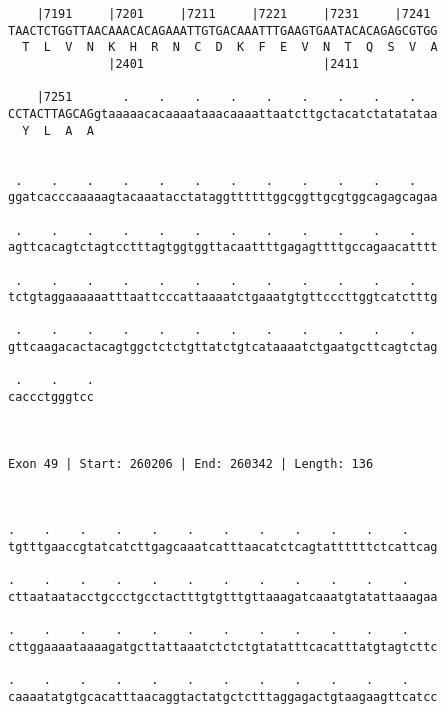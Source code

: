 \documentclass{article}
\begin{document}
\begin{Verbatim}
    |7191     |7201     |7211     |7221     |7231     |7241 
TAACTCTGGTTAACAAACACAGAAATTGTGACAAATTTGAAGTGAATACACAGAGCGTGG
  T  L  V  N  K  H  R  N  C  D  K  F  E  V  N  T  Q  S  V  A
              |2401                         |2411           
  
    |7251       .    .    .    .    .    .    .    .    .   
CCTACTTAGCAGgtaaaaacacaaaataaacaaaattaatcttgctacatctatatataa
  Y  L  A  A                                                
                                                            
  
 .    .    .    .    .    .    .    .    .    .    .    .   
ggatcacccaaaaagtacaaatacctataggttttttggcggttgcgtggcagagcagaa
                                                            
 .    .    .    .    .    .    .    .    .    .    .    .   
agttcacagtctagtcctttagtggtggttacaattttgagagttttgccagaacatttt
                                                            
 .    .    .    .    .    .    .    .    .    .    .    .   
tctgtaggaaaaaatttaattcccattaaaatctgaaatgtgttcccttggtcatctttg
                                                            
 .    .    .    .    .    .    .    .    .    .    .    .   
gttcaagacactacagtggctctctgttatctgtcataaaatctgaatgcttcagtctag
                                                            
 .    .    .
caccctgggtcc
            
            
 
Exon 49 | Start: 260206 | End: 260342 | Length: 136



.    .    .    .    .    .    .    .    .    .    .    .    
tgtttgaaccgtatcatcttgagcaaatcatttaacatctcagtattttttctcattcag
                                                            
.    .    .    .    .    .    .    .    .    .    .    .    
cttaataatacctgccctgcctactttgtgtttgttaaagatcaaatgtatattaaagaa
                                                            
.    .    .    .    .    .    .    .    .    .    .    .    
cttggaaaataaaagatgcttattaaatctctctgtatatttcacatttatgtagtcttc
                                                            
.    .    .    .    .    .    .    .    .    .    .    .    
caaaatatgtgcacatttaacaggtactatgctctttaggagactgtaagaagttcatcc
                                                            

\end{Verbatim}
\end{document}
